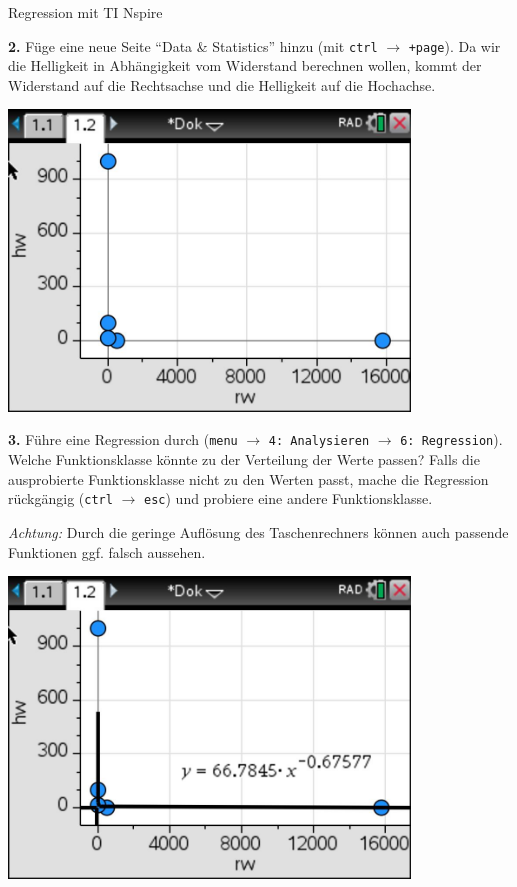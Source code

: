 \begin{zsfg}{Regression mit TI Nspire}
	
	\begin{minipage}[c][4.5cm][t]{0.48\textwidth}
		\textbf{2.} Füge eine neue Seite \enquote{Data \& Statistics} hinzu (mit \texttt{ctrl} $\rightarrow$ \texttt{+page}). Da wir die Helligkeit in Abhängigkeit vom Widerstand berechnen wollen, kommt der Widerstand auf die Rechtsachse und die Helligkeit auf die Hochachse.
	\end{minipage}
	\hfill
	\begin{minipage}[c][4.5cm][t]{0.48\textwidth}
		\centering
		\includegraphics[width=0.8\textwidth]{./pics/RegressionLDR-TI-2.jpg}
	\end{minipage}
	
	\begin{minipage}[c][6cm][t]{0.48\textwidth}
		\textbf{3.} Führe eine Regression durch (\texttt{menu} $\rightarrow$ \texttt{4: Analysieren} $\rightarrow$ \texttt{6: Regression}). Welche Funktionsklasse könnte zu der Verteilung der Werte passen? Falls die ausprobierte Funktionsklasse nicht zu den Werten passt, mache die Regression rückgängig (\texttt{ctrl} $\rightarrow$ \texttt{esc}) und probiere eine andere Funktionsklasse.
		
		\emph{Achtung:} Durch die geringe Auflösung des Taschenrechners können auch passende Funktionen ggf. falsch aussehen.
	\end{minipage}
	\hfill
	\begin{minipage}[c][6cm][t]{0.48\textwidth}
		\centering
		\includegraphics[width=0.8\textwidth]{./pics/RegressionLDR-TI-3.jpg}
	\end{minipage}
	

\end{zsfg}
